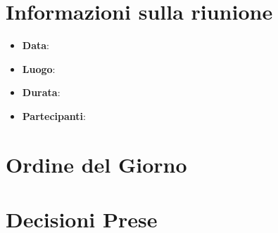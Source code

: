 \section{Informazioni sulla riunione}
\begin{itemize}
	\item \textbf{Data}: \data
	\item \textbf{Luogo}:\ \luogo
	\item \textbf{Durata}: \durata
	\item \textbf{Partecipanti}: \partecipanti
\end{itemize}
\section{Ordine del Giorno}
\ordineDelGiorno

\section{Decisioni Prese}
\contenuto
